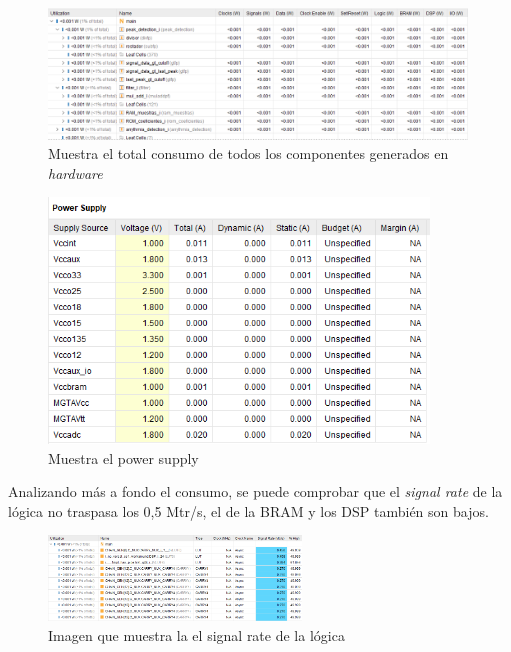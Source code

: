 	\begin{figure}[h!]
		\centering
		\includegraphics[width=0.99\textwidth]{./Images/img_res_experimentales/hierarchical.png}
		\caption{Muestra el total consumo de todos los componentes generados en  \textit{hardware} }
		\label{fig:hierarchical}
	\end{figure} 

	\begin{figure}[h!]
		\centering
		\includegraphics[width=0.9\textwidth]{./Images/img_res_experimentales/powersupply.png}
		\caption{Muestra el power supply}
		\label{fig:powersupply}
	\end{figure} 
	\FloatBarrier

	Analizando más a fondo el consumo, se puede comprobar que el \textit{signal rate} de la lógica no traspasa los 0,5 Mtr/s, el de la BRAM y los DSP también son bajos.
	
	\begin{figure}[h!]
		\centering
		\includegraphics[width=0.6\textwidth]{./Images/img_res_experimentales/signalratelogic.png}
		\caption{Imagen que muestra la el signal rate de la lógica}
		\label{fig:signalratelogic}
	\end{figure} 

